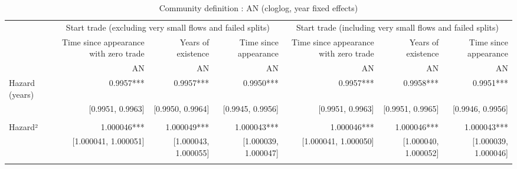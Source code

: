 \begin{table}[!h]
\caption{Community definition : AN (cloglog, year fixed effects)}
\centering
\begin{tabular}{lllllll}
\cline{1-7}
\multicolumn{1}{c}{} &
  \multicolumn{3}{|c}{Start trade (excluding very small flows and failed splits)} &
  \multicolumn{3}{c}{Start trade (including very small flows and failed splits)} \\
\multicolumn{1}{c}{} &
  \multicolumn{1}{|r}{Time since appearance with zero trade} &
  \multicolumn{1}{r}{Years of existence} &
  \multicolumn{1}{r}{Time since appearance} &
  \multicolumn{1}{r}{Time since appearance with zero trade} &
  \multicolumn{1}{r}{Years of existence} &
  \multicolumn{1}{r}{Time since appearance} \\
\multicolumn{1}{c}{} &
  \multicolumn{1}{|r}{AN} &
  \multicolumn{1}{r}{AN} &
  \multicolumn{1}{r}{AN} &
  \multicolumn{1}{r}{AN} &
  \multicolumn{1}{r}{AN} &
  \multicolumn{1}{r}{AN} \\
\cline{1-7}
\multicolumn{1}{l}{Hazard (years)} &
  \multicolumn{1}{|r}{0.9957***} &
  \multicolumn{1}{r}{0.9957***} &
  \multicolumn{1}{r}{0.9950***} &
  \multicolumn{1}{r}{0.9957***} &
  \multicolumn{1}{r}{0.9958***} &
  \multicolumn{1}{r}{0.9951***} \\
\multicolumn{1}{l}{} &
  \multicolumn{1}{|r}{[0.9951, 0.9963]} &
  \multicolumn{1}{r}{[0.9950, 0.9964]} &
  \multicolumn{1}{r}{[0.9945, 0.9956]} &
  \multicolumn{1}{r}{[0.9951, 0.9963]} &
  \multicolumn{1}{r}{[0.9951, 0.9965]} &
  \multicolumn{1}{r}{[0.9946, 0.9956]} \\
\multicolumn{1}{l}{} &
  \multicolumn{1}{|r}{} &
  \multicolumn{1}{r}{} &
  \multicolumn{1}{r}{} &
  \multicolumn{1}{r}{} &
  \multicolumn{1}{r}{} &
  \multicolumn{1}{r}{} \\
\multicolumn{1}{l}{Hazard²} &
  \multicolumn{1}{|r}{1.000046***} &
  \multicolumn{1}{r}{1.000049***} &
  \multicolumn{1}{r}{1.000043***} &
  \multicolumn{1}{r}{1.000046***} &
  \multicolumn{1}{r}{1.000046***} &
  \multicolumn{1}{r}{1.000043***} \\
\multicolumn{1}{l}{} &
  \multicolumn{1}{|r}{[1.000041, 1.000051]} &
  \multicolumn{1}{r}{[1.000043, 1.000055]} &
  \multicolumn{1}{r}{[1.000039, 1.000047]} &
  \multicolumn{1}{r}{[1.000041, 1.000050]} &
  \multicolumn{1}{r}{[1.000040, 1.000052]} &
  \multicolumn{1}{r}{[1.000039, 1.000046]} \\
\multicolumn{1}{l}{} &
  \multicolumn{1}{|r}{} &
  \multicolumn{1}{r}{} &
  \multicolumn{1}{r}{} &
  \multicolumn{1}{r}{} &

\end{tabular}
\end{table}
